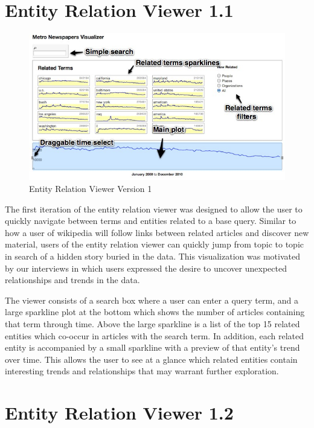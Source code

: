 \section{Entity Relation Viewer 1.1}

\begin{figure}[htb]
  \centerline{
    \includegraphics[scale=0.37]{figures/relation-0.jpg}
  }
  \caption{Entity Relation Viewer Version 1}
  \label{fig:explorer-0}
\end{figure}

The first iteration of the entity relation viewer was designed to allow the user to quickly navigate between terms and entities related to a base query. Similar to how a user of wikipedia will follow links between related articles and discover new material, users of the entity relation viewer can quickly jump from topic to topic in search of a hidden story buried in the data. This visualization was motivated by our interviews in which users expressed the desire to uncover unexpected relationships and trends in the data.

The viewer consists of a search box where a user can enter a query term, and a large sparkline plot at the bottom which shows the number of articles containing that term through time. Above the large sparkline is a list of the top 15 related entities which co-occur in articles with the search term. In addition, each related entity is accompanied by a small sparkline with a preview of that entity's trend over time. This allows the user to see at a glance which related entities contain interesting trends and relationships that may warrant further exploration.

\section{Entity Relation Viewer 1.2}


